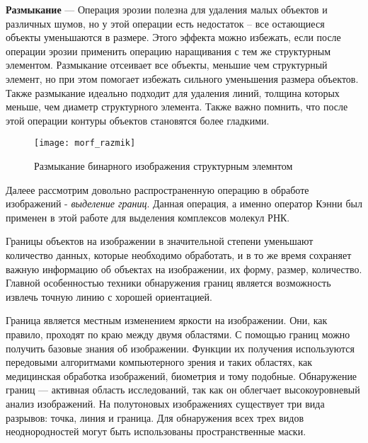 	\textbf{Размыкание} — Операция эрозии полезна для удаления малых объектов и различных шумов, но у этой операции есть недостаток – все остающиеся объекты уменьшаются в размере. Этого эффекта можно избежать, если после операции эрозии применить операцию наращивания с тем же структурным элементом.
	Размыкание отсеивает все объекты, меньшие чем структурный элемент, но при этом помогает избежать сильного уменьшения размера объектов. Также размыкание идеально подходит для удаления линий, толщина которых меньше, чем диаметр структурного элемента. Также важно помнить, что после этой операции контуры объектов становятся более гладкими.
	\begin{figure}[H]
		\centering
		\texttt{[image: morf\_razmik]}
		\caption{Размыкание бинарного изображения структурным элемнтом}
		\label{morf_razmik}
	\end{figure}

Далеее рассмотрим довольно распространенную операцию в обработе изображений - \textit{выделение границ}. Данная операция, а именно оператор Кэнни был применен в этой работе для выделения комплексов молекул РНК.

Границы объектов на изображении в значительной степени уменьшают количество данных, которые необходимо обработать, и в то же время сохраняет важную информацию об объектах на изображении, их форму, размер, количество. Главной особенностью техники обнаружения границ является возможность извлечь точную линию с хорошей ориентацией.

Граница является местным изменением яркости на изображении. Они, как правило, проходят по краю между двумя областями. С помощью границ можно получить базовые знания об изображении. Функции их получения используются передовыми алгоритмами компьютерного зрения и таких областях, как медицинская обработка изображений, биометрия и тому подобные. Обнаружение границ — активная область исследований, так как он облегчает высокоуровневый анализ изображений. На полутоновых изображениях существует три вида разрывов: точка, линия и граница. Для обнаружения всех трех видов неоднородностей могут быть использованы пространственные маски.

